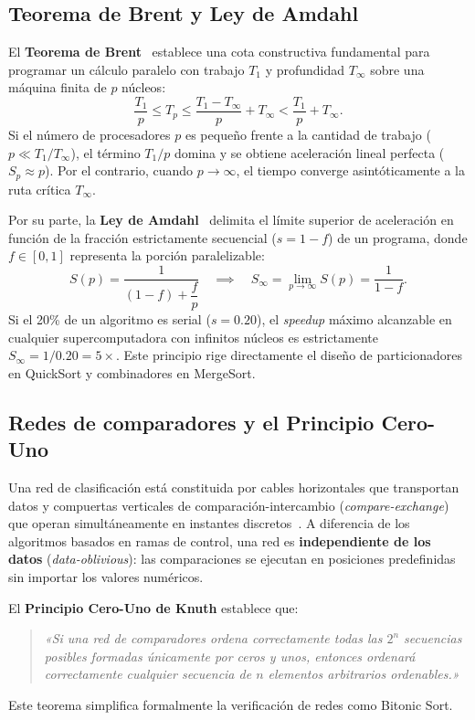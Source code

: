 \documentclass[11pt,letterpaper,oneside]{article}
\begin{document}
\subsection{Teorema de Brent y Ley de Amdahl}
El \textbf{Teorema de Brent}~\cite{brent} establece una cota constructiva fundamental para programar un cálculo paralelo con trabajo $T_1$ y profundidad $T_\infty$ sobre una máquina finita de $p$ núcleos:
\begin{equation}
  \frac{T_1}{p} \le T_p \le \frac{T_1 - T_\infty}{p} + T_\infty < \frac{T_1}{p} + T_\infty.
  \label{eq:brent}
\end{equation}
Si el número de procesadores $p$ es pequeño frente a la cantidad de trabajo ($p \ll T_1 / T_\infty$), el término $T_1/p$ domina y se obtiene aceleración lineal perfecta ($S_p \approx p$). Por el contrario, cuando $p \to \infty$, el tiempo converge asintóticamente a la ruta crítica $T_\infty$.

Por su parte, la \textbf{Ley de Amdahl}~\cite{amdahl} delimita el límite superior de aceleración en función de la fracción estrictamente secuencial ($s = 1 - f$) de un programa, donde $f \in [0, 1]$ representa la porción paralelizable:
\begin{equation}
  S(p) = \frac{1}{(1 - f) + \dfrac{f}{p}} \quad \implies \quad S_\infty = \lim_{p \to \infty} S(p) = \frac{1}{1 - f}.
  \label{eq:amdahl}
\end{equation}
Si el 20\% de un algoritmo es serial ($s = 0.20$), el \emph{speedup} máximo alcanzable en cualquier supercomputadora con infinitos núcleos es estrictamente $S_\infty = 1 / 0.20 = 5\times$. Este principio rige directamente el diseño de particionadores en QuickSort y combinadores en MergeSort.

\subsection{Redes de comparadores y el Principio Cero-Uno}
Una red de clasificación está constituida por cables horizontales que transportan datos y compuertas verticales de comparación-intercambio (\emph{compare-exchange}) que operan simultáneamente en instantes discretos~\cite{knuth3}. A diferencia de los algoritmos basados en ramas de control, una red es \textbf{independiente de los datos} (\emph{data-oblivious}): las comparaciones se ejecutan en posiciones predefinidas sin importar los valores numéricos.

El \textbf{Principio Cero-Uno de Knuth} establece que:
\begin{quote}
\emph{«Si una red de comparadores ordena correctamente todas las $2^n$ secuencias posibles formadas únicamente por ceros y unos, entonces ordenará correctamente cualquier secuencia de $n$ elementos arbitrarios ordenables.»}
\end{quote}
Este teorema simplifica formalmente la verificación de redes como Bitonic Sort.
\end{document}
